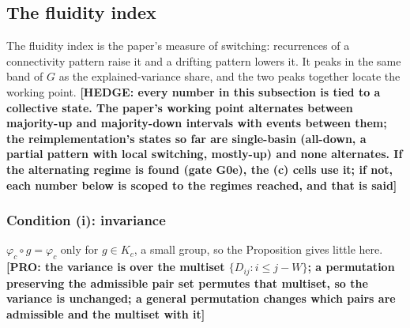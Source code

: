 \documentclass[11pt]{article}
\newcommand{\HEDGE}[1]{\textcolor{green!40!black}{\textbf{[HEDGE: #1]}}}
\newcommand{\PRO}[1]{\textcolor{blue!55!black}{\textbf{[PRO: #1]}}}
\begin{document}
\subsection{The fluidity index}
The fluidity index is the paper's measure of switching: recurrences of a connectivity pattern raise it and a drifting pattern lowers it. It peaks in the same band of $G$ as the explained-variance share, and the two peaks together locate the working point. \HEDGE{every number in this subsection is tied to a collective state. The paper's working point alternates between majority-up and majority-down intervals with events between them; the reimplementation's states so far are single-basin (all-down, a partial pattern with local switching, mostly-up) and none alternates. If the alternating regime is found (gate G0e), the (c) cells use it; if not, each number below is scoped to the regimes reached, and that is said}

\subsubsection{Condition (i): invariance}
$\varphi_c\circ g=\varphi_c$ only for $g\in K_c$, a small group, so the Proposition gives little here. \PRO{the variance is over the multiset $\{D_{ij}: i\le j-W\}$; a permutation preserving the admissible pair set permutes that multiset, so the variance is unchanged; a general permutation changes which pairs are admissible and the multiset with it}
\end{document}
